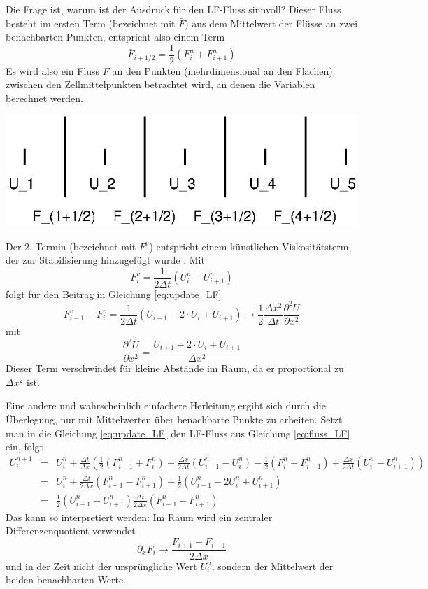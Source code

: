 Die Frage ist, warum ist der Ausdruck für den LF-Fluss sinnvoll?
Dieser Fluss besteht im ersten Term (bezeichnet mit $\bar{F}$) aus dem
Mittelwert der Flüsse an zwei benachbarten Punkten, entspricht also
einem Term
\[
\bar{F}_{i+1/2} = \frac{1}{2}\left(F_i^n+F_{i+1}^n \right)
\]
Es wird also ein Fluss $F$ an den Punkten (mehrdimensional
an den Flächen) zwischen den Zellmittelpunkten betrachtet wird, an
denen die Variablen berechnet werden.
\begin{center}
\includegraphics[scale=0.7]{raumaufteilung}
\end{center}
Der 2. Termin (bezeichnet mit $F^v$) entspricht einem künstlichen
Viskositätsterm, der zur Stabilisierung hinzugefügt wurde . Mit
\[
F^v_i = \frac{1}{2 \Delta t}\left(U_i^n - U_{i+1}^n
\right)
\]
folgt für den Beitrag in Gleichung \ref{eq:update_LF}
\[
F^v_{i-1} - F^v_i = \frac{1}{2 \Delta t}\left( U_{i-1} - 2\cdot
U_{i} + U_{i+1} \right) \rightarrow \frac{1}{2}\frac{\Delta
    x^2}{\Delta t} \frac{\partial^2 U}{\partial x^2}
\]
mit
\[
\frac{\partial^2 U}{\partial x^2} = \frac{U_{i+1} - 2\cdot U_{i} +
  U_{i+1} }{\Delta x^2}
\]
Dieser Term verschwindet für kleine Abstände im Raum, da er
proportional zu $\Delta x^2$ ist.

Eine andere und wahrscheinlich einfachere Herleitung ergibt sich durch
die Überlegung, nur mit Mittelwerten über benachbarte Punkte zu
arbeiten. Setzt man in die Gleichung \ref{eq:update_LF} den LF-Fluss
aus Gleichung \ref{eq:fluss_LF} ein, folgt
\begin{eqnarray}
U_i^{n+1} &=& U_i^n + \frac{\Delta t}{\Delta x}\left(
\frac{1}{2}\left(F_{i-1}^n+F_{i}^n \right) + \frac{\Delta x}{2
  \Delta t}\left(U_{i-1}^n - U_{i}^n \right)
-
\frac{1}{2}\left(F_i^n+F_{i+1}^n \right) + \frac{\Delta x}{2
  \Delta t}\left(U_i^n - U_{i+1}^n \right)
\right) \nonumber\\
&=&
U_i^n + \frac{\Delta t}{2\Delta x}
\left(F_{i-1}^n -F_{i+1}^n \right) +
\frac{1}{2} \left(U_{i-1}^n -  2 U_{i}^n + U_{i+1}^n\right) \nonumber\\
&=& \frac{1}{2} \left(U_{i-1}^n + U_{i+1}^n\right)\frac{\Delta t}{2\Delta x}
\left(F_{i-1}^n -F_{i+1}^n \right)
\end{eqnarray}
Das kann so interpretiert werden: Im Raum wird ein zentraler
Differenzenquotient verwendet
\[
\partial_x F_i \rightarrow \frac{F_{i+1} - F_{i-1}}{2\Delta x}
\]
und in der Zeit nicht der ursprüngliche Wert $U_i^n$, sondern der Mittelwert der beiden benachbarten Werte.


